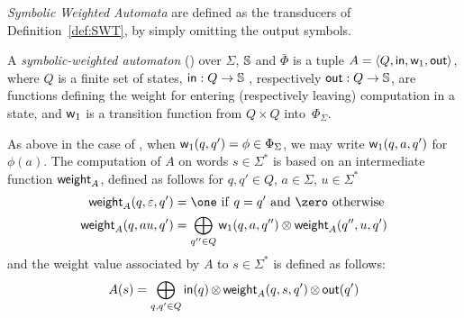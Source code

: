 \noindent
 \emph{Symbolic Weighted Automata} %
are defined  as the transducers of Definition~\ref{def:SWT},
by simply omitting the output symbols.
%
%
\begin{definition} \label{def:SWA}
A \emph{symbolic-weighted automaton} (\SWA)
over $\Sigma$, $\mathbb{S}$ and $\bar\Phi$
is a tuple
$A = \< Q, \init, {\wei_1}, \final >$,
where $Q$ is a finite set of states,
$\mathsf{in} : Q \to \mathbb{S}$ %
, respectively $\mathsf{out} : Q \to \mathbb{S}$,  %
are functions defining the weight for entering
(respectively leaving) computation in a state,
and ${\mathsf{w}_1}$ is a transition function
from $Q \times Q$ into~$\Phi_{\Sigma}$.
\end{definition}
%
\noindent
As above in the case of \SWT,
when $\mathsf{w}_1(q, q') = \phi \in \Phi_\Sigma$,
we may write $\mathsf{w}_1(q, a, q')$ for~$\phi(a)$.
The computation of $A$ on words $s \in \Sigma^*$
is based on an intermediate function $\mathsf{weight}_A$,
defined as follows for $q, q' \in Q$, $a \in \Sigma$, $u \in \Sigma^*$
%
\begin{align}
\weight_A(q, \varepsilon, q') & = \one\ \mathrm{if}\  q = q'\ 
          \mathrm{and}\  \zero\  \mathrm{otherwise}\\
\weight_A(q, au, q') & =  \displaystyle\bigoplus_{q'' \in Q}
    \wei_{1}(q, a, q'') \otimes \weight_A(q'', u, q')\nonumber
\label{eq:SWA-weight}
\end{align}
%
\noindent
and the weight value associated by $A$ to
$s \in \Sigma^*$ is defined as follows: %
\begin{equation}
A(s)  =
\displaystyle\bigoplus_{q, q' \in Q} \mathsf{in}(q)
\mathop{\otimes} \mathsf{weight}_A(q, s, q') \mathop{\otimes} \mathsf{out}(q')
\label{eq:SWA-value}
\end{equation}


%

